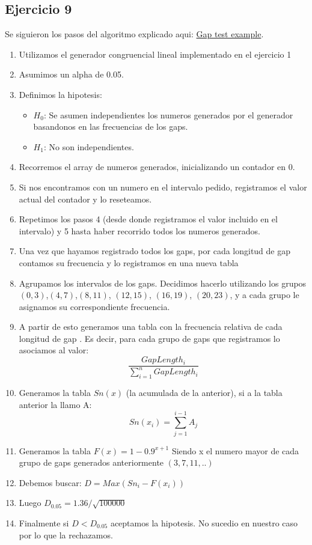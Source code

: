 \documentclass[11pt,a4paper]{article}
\begin{document}
	\subsection{Ejercicio 9}
	Se siguieron los pasos del algoritmo explicado aqui: \href{https://www.youtube.com/watch?v=xh-4iOv-Oyk}{Gap test example}.
	\begin{enumerate}
		\item Utilizamos el generador congruencial lineal implementado en el ejercicio 1
		\item Asumimos un alpha de 0.05. 
		\item Definimos la hipotesis:
		\begin{itemize}
			\item $H_0$: Se asumen independientes los numeros generados por el generador basandonos en las frecuencias de los gaps.
			\item $H_1$: No son independientes.
		\end{itemize}  
		\item Recorremos el array de numeros generados, inicializando un contador en 0.
		\item Si nos encontramos con un numero en el intervalo pedido, registramos el valor actual del contador y lo reseteamos.
		\item Repetimos los pasos 4 (desde donde registramos el valor incluido en el intervalo) y 5 hasta haber recorrido todos los numeros generados.
		\item Una vez que hayamos registrado todos los gaps, por cada longitud de gap contamos su frecuencia y lo registramos en una nueva tabla
		\item Agrupamos los intervalos de los gaps. Decidimos hacerlo utilizando los grupos $(0,3)$,$(4,7)$,$(8,11)$, 
		$(12,15)$, $(16,19)$, $(20,23)$, y a cada grupo le asignamos su correspondiente frecuencia.
		\item A partir de esto generamos una tabla con la frecuencia relativa de cada longitud de gap . Es decir, para cada grupo de gaps que registramos lo asociamos al valor: \[\frac{GapLength_{i}}{\sum_{i=1}^{n}GapLength_{i}}\]
		
		\item Generamos la tabla $Sn(x)$ (la acumulada de la anterior), si a la tabla anterior la llamo A:
		\[ Sn(x_{i})= {\sum_{j=1}^{i-1}A_{j}}\]
		\item Generamos la tabla 
		 $F(x) = 1 - 0.9^{x + 1}$ 
		 Siendo x el numero mayor de cada grupo de gaps generados anteriormente $(3,7,11,..)$
		\item Debemos buscar:
		$D = Max(Sn_{i} - F(x_{i}))$
		\item Luego
		$D_{0.05} = 1.36/\sqrt{100000}$
		\item Finalmente si $D < D_{0.05}$ aceptamos la hipotesis. No sucedio en nuestro caso por lo que la rechazamos.
	\end{enumerate}
\end{document}
